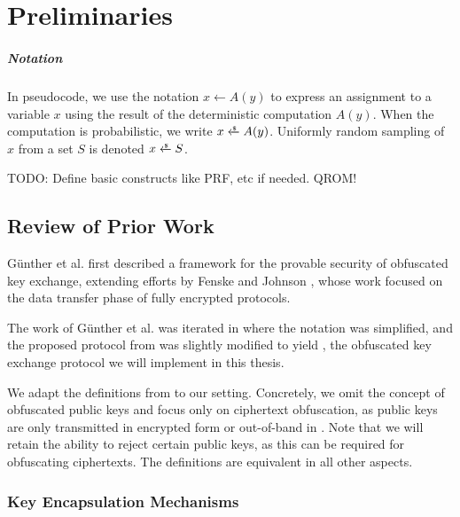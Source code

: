 \chapter{Preliminaries}\label{ch:preliminaries}

\paragraph{Notation}
In pseudocode, we use the notation $x \gets A(y)$ to express an assignment to a variable $x$ using the result of the deterministic computation $A(y)$. When the computation is probabilistic, we write $x \getsr A(y)$.
Uniformly random sampling of $x$ from a set $S$ is denoted $x \getsr S$.

TODO: Define basic constructs like PRF, etc if needed. QROM!

\section{Review of Prior Work} \label{sec:review-gsv24}

Günther et al. \cite{CCS:GunSteVei24} first described a framework for the provable security of obfuscated key exchange, extending efforts by Fenske and Johnson \cite{CCS:FenJoh24}, whose work focused on the data transfer phase of fully encrypted protocols.

The work of Günther et al. was iterated in \cite{EPRINT:GRSV25} where the notation was simplified, and the proposed protocol from \cite{CCS:GunSteVei24} was slightly modified to yield \drivel{}, the obfuscated key exchange protocol we will implement in this thesis.

We adapt the definitions from \cite{CCS:GunSteVei24,EPRINT:GRSV25} to our setting. Concretely, we omit the concept of obfuscated public keys and focus only on ciphertext obfuscation, as public keys are only transmitted in encrypted form or out-of-band in \drivel{}. Note that we will retain the ability to reject certain public keys, as this can be required for obfuscating ciphertexts. The definitions are equivalent in all other aspects.

\subsection{Key Encapsulation Mechanisms}

